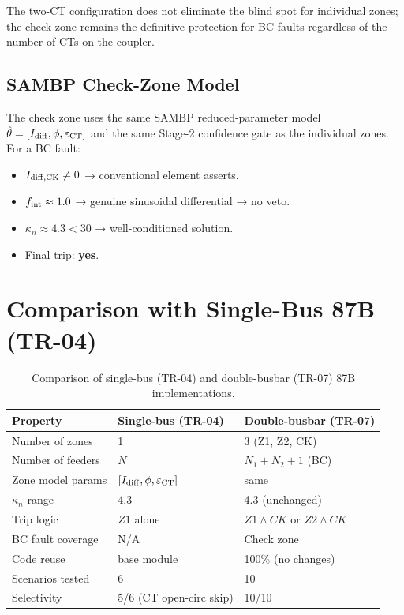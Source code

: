 \documentclass[12pt,a4paper]{article}
\newcommand{\kn}{\kappa_n}
\newcommand{\fint}{f_{\rm int}}
\begin{document}
The two-CT configuration does not eliminate the blind spot for individual
zones; the check zone remains the definitive protection for BC faults
regardless of the number of CTs on the coupler.

\subsection{SAMBP Check-Zone Model}

The check zone uses the same SAMBP reduced-parameter model
$\hat\theta = [I_{\rm diff}, \phi, \varepsilon_{\rm CT}]$ and the same
Stage-2 confidence gate as the individual zones.  For a BC fault:
\begin{itemize}
  \item $I_{\rm diff,CK} \neq 0$ → conventional element asserts.
  \item $\fint \approx 1.0$ → genuine sinusoidal differential → no veto.
  \item $\kn \approx 4.3 < 30$ → well-conditioned solution.
  \item Final trip: \textbf{yes}.
\end{itemize}

\section{Comparison with Single-Bus 87B (TR-04)}

\begin{table}[H]
  \centering
  \caption{Comparison of single-bus (TR-04) and double-busbar (TR-07)
           87B implementations.}
  \label{tab:comparison}
  \begin{tabular}{lll}
    \toprule
    Property & Single-bus (TR-04) & Double-busbar (TR-07) \\
    \midrule
    Number of zones    & 1 & 3 (Z1, Z2, CK) \\
    Number of feeders  & $N$ & $N_1 + N_2 + 1$ (BC) \\
    Zone model params  & $[I_{\rm diff}, \phi, \varepsilon_{\rm CT}]$ & same \\
    $\kn$ range        & 4.3 & 4.3 (unchanged) \\
    Trip logic         & $Z1$ alone & $Z1\wedge CK$ or $Z2\wedge CK$ \\
    BC fault coverage  & N/A & Check zone \\
    Code reuse         & base module & 100\% (no changes) \\
    Scenarios tested   & 6 & 10 \\
    Selectivity        & 5/6 (CT open-circ skip) & 10/10 \\
    \bottomrule
  \end{tabular}
\end{table}
\end{document}
